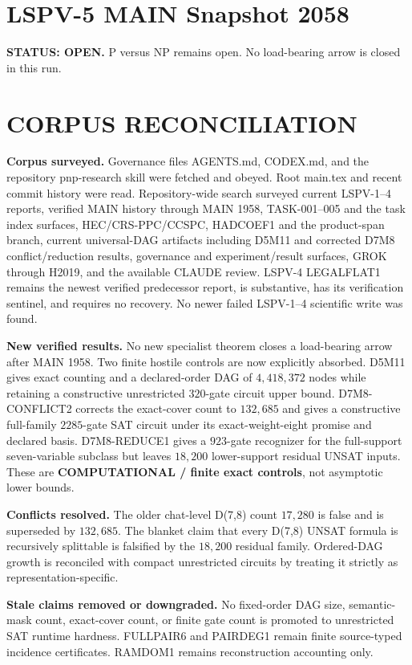 \documentclass[11pt]{article}
\begin{document}
\section*{LSPV-5 MAIN Snapshot 2058}
\textbf{STATUS: OPEN.} P versus NP remains open. No load-bearing arrow is closed in this run.

\section*{CORPUS RECONCILIATION}
\textbf{Corpus surveyed.}
Governance files AGENTS.md, CODEX.md, and the repository pnp-research skill were fetched and obeyed. Root main.tex and recent commit history were read. Repository-wide search surveyed current LSPV-1--4 reports, verified MAIN history through MAIN 1958, TASK-001--005 and the task index surfaces, HEC/CRS-PPC/CCSPC, HADCOEF1 and the product-span branch, current universal-DAG artifacts including D5M11 and corrected D7M8 conflict/reduction results, governance and experiment/result surfaces, GROK through H2019, and the available CLAUDE review. LSPV-4 LEGALFLAT1 remains the newest verified predecessor report, is substantive, has its verification sentinel, and requires no recovery. No newer failed LSPV-1--4 scientific write was found.

\textbf{New verified results.}
No new specialist theorem closes a load-bearing arrow after MAIN 1958. Two finite hostile controls are now explicitly absorbed. D5M11 gives exact counting and a declared-order DAG of \(4{,}418{,}372\) nodes while retaining a constructive unrestricted \(320\)-gate circuit upper bound. D7M8-CONFLICT2 corrects the exact-cover count to \(132{,}685\) and gives a constructive full-family \(2285\)-gate SAT circuit under its exact-weight-eight promise and declared basis. D7M8-REDUCE1 gives a \(923\)-gate recognizer for the full-support seven-variable subclass but leaves \(18{,}200\) lower-support residual UNSAT inputs. These are \textbf{COMPUTATIONAL / finite exact controls}, not asymptotic lower bounds.

\textbf{Conflicts resolved.}
The older chat-level D(7,8) count \(17{,}280\) is false and is superseded by \(132{,}685\). The blanket claim that every D(7,8) UNSAT formula is recursively splittable is falsified by the \(18{,}200\) residual family. Ordered-DAG growth is reconciled with compact unrestricted circuits by treating it strictly as representation-specific.

\textbf{Stale claims removed or downgraded.}
No fixed-order DAG size, semantic-mask count, exact-cover count, or finite gate count is promoted to unrestricted SAT runtime hardness. FULLPAIR6 and PAIRDEG1 remain finite source-typed incidence certificates. RAMDOM1 remains reconstruction accounting only.
\end{document}
